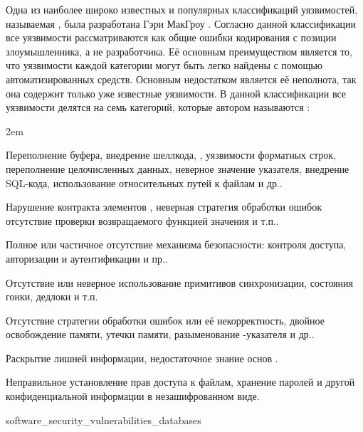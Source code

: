 \Sentence
Одна из наиболее широко известных и популярных классификаций уязвимостей, называемая 
, была разработана Гэри МакГроу 
  . 
\Sentence
Согласно данной классификации все уязвимости рассматриваются как общие ошибки кодирования 
с позиции злоумышленника, а не разработчика. 
\Sentence
Её основным преимуществом является то, что уязвимости каждой категории могут быть легко найдены с 
помощью автоматизированных средств. 
\Sentence
Основным недостатком является её неполнота, так она содержит только уже известные уязвимости. 
\Sentence
В данной классификации все уязвимости делятся на семь категорий, которые автором называются 
:  
\begin{description}
	\leftskip2em%
	\setlength{\itemsep}{0pt}%
	\setlength{\parsep}{0pt}%

	\item[Проверка входных данных и их представление.] Переполнение буфера, внедрение шеллкода, 
		, уязвимости форматных строк, переполнение целочисленных данных, 
		неверное значение указателя, внедрение SQL-кода, использование относительных путей к файлам 
		и др..
	\item[Неправильное использование API.] Нарушение контракта элементов 
		, неверная стратегия обработки ошибок отсутствие проверки 
		возвращаемого функцией значения и т.п..
	\item[Средства безопасности.] Полное или частичное отсутствие механизма безопасности: контроля 
		доступа, авторизации и аутентификации и пр..
	\item[Время и состояние.] Отсутствие или неверное использование примитивов синхронизации, 
		состояния гонки, дедлоки и т.п.
	\item[Ошибки.] Отсутствие стратегии обработки ошибок или её некорректность, двойное освобождение 
		памяти, утечки памяти, разыменование -указателя и др..
	\item[Инкапсуляция.] Раскрытие лишней информации, недостаточное знание основ 
		.
	\item[Программное окружение.] Неправильное установление прав доступа к файлам, хранение паролей 
		и другой конфиденциальной информации в незашифрованном виде.
\end{description}

	{software_security_vulnerabilities_databases}

